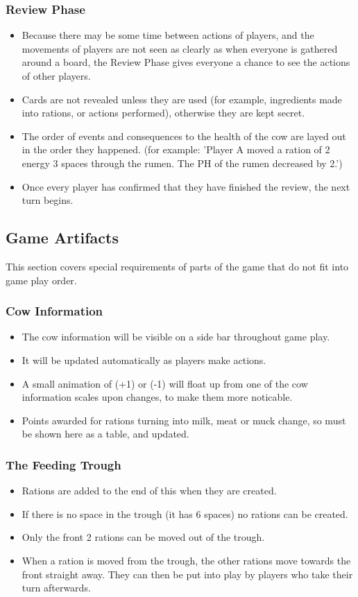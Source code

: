 	\subsubsection{Review Phase}
	  \begin{itemize}
	  	\item \pB Because there may be some time between actions of players, and the movements of players are not seen as clearly as when everyone is gathered around a board, the Review Phase gives everyone a chance to see the actions of other players.
	  	\item \pB Cards are not revealed unless they are used (for example, ingredients made into rations, or actions performed), otherwise they are kept secret.
	  	\item \pB The order of events and consequences to the health of the cow are layed out in the order they happened. (for example: 'Player A moved a ration of 2 energy 3 spaces through the rumen. The PH of the rumen decreased by 2.')
	  	\item \pB Once every player has confirmed that they have finished the review, the next turn begins.
	  \end{itemize}

\subsection{Game Artifacts}
This section covers special requirements of parts of the game that do not fit into game play order.
	\subsubsection{Cow Information}
	  \begin{itemize}
	  	\item \pA The cow information will be visible on a side bar throughout game play.
	  	\item \pA It will be updated automatically as players make actions.
	  	\item \pD A small animation of (+1) or (-1) will float up from one of the cow information scales upon changes, to make them more noticable.
	  	\item \pA Points awarded for rations turning into milk, meat or muck change, so must be shown here as a table, and updated.
	  \end{itemize}	
	\subsubsection{The Feeding Trough}
	  \begin{itemize}
	  	\item \pA Rations are added to the end of this when they are created.
	  	\item \pA If there is no space in the trough (it has 6 spaces) no rations can be created.
	  	\item \pA Only the front 2 rations can be moved out of the trough.
	  	\item \pA When a ration is moved from the trough, the other rations move towards the front straight away. They can then be put into play by players who take their turn afterwards.
	  \end{itemize}
